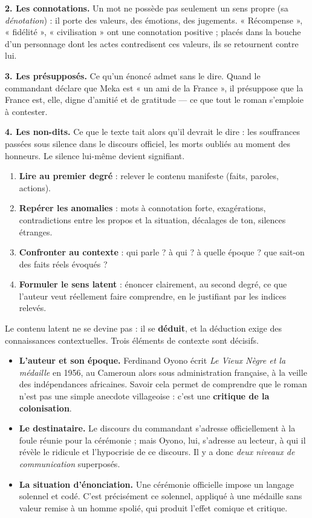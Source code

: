 \documentclass[11pt]{article}
\newcounter{popsec}
\newcounter{popsub}
\newcommand{\courssub}[1]{%
  \stepcounter{popsub}%
  \par\vspace{9pt}\noindent{\popxbold\fontsize{11.5}{13}\selectfont\color{popink}{\color{poporange}\thepopsec.\thepopsub}\hspace{6pt}#1}\par\nopagebreak\vspace{4pt}
}
\begin{document}
\textbf{2. Les connotations.} Un mot ne possède pas seulement un sens propre (sa \emph{dénotation}) : il porte des valeurs, des émotions, des jugements. « Récompense », « fidélité », « civilisation » ont une connotation positive ; placés dans la bouche d'un personnage dont les actes contredisent ces valeurs, ils se retournent contre lui.

\textbf{3. Les présupposés.} Ce qu'un énoncé admet sans le dire. Quand le commandant déclare que Meka est « un ami de la France », il présuppose que la France est, elle, digne d'amitié et de gratitude — ce que tout le roman s'emploie à contester.

\textbf{4. Les non-dits.} Ce que le texte tait alors qu'il devrait le dire : les souffrances passées sous silence dans le discours officiel, les morts oubliés au moment des honneurs. Le silence lui-même devient signifiant.

\begin{methode}
\begin{enumerate}
\item \textbf{Lire au premier degré} : relever le contenu manifeste (faits, paroles, actions).
\item \textbf{Repérer les anomalies} : mots à connotation forte, exagérations, contradictions entre les propos et la situation, décalages de ton, silences étranges.
\item \textbf{Confronter au contexte} : qui parle ? à qui ? à quelle époque ? que sait-on des faits réels évoqués ?
\item \textbf{Formuler le sens latent} : énoncer clairement, au second degré, ce que l'auteur veut réellement faire comprendre, en le justifiant par les indices relevés.
\end{enumerate}
\end{methode}

\courssub{Le rôle du contexte dans le décodage}

Le contenu latent ne se devine pas : il se \textbf{déduit}, et la déduction exige des connaissances contextuelles. Trois éléments de contexte sont décisifs.

\begin{itemize}
\item \textbf{L'auteur et son époque.} Ferdinand Oyono écrit \emph{Le Vieux Nègre et la médaille} en 1956, au Cameroun alors sous administration française, à la veille des indépendances africaines. Savoir cela permet de comprendre que le roman n'est pas une simple anecdote villageoise : c'est une \textbf{critique de la colonisation}.
\item \textbf{Le destinataire.} Le discours du commandant s'adresse officiellement à la foule réunie pour la cérémonie ; mais Oyono, lui, s'adresse au lecteur, à qui il révèle le ridicule et l'hypocrisie de ce discours. Il y a donc \emph{deux niveaux de communication} superposés.
\item \textbf{La situation d'énonciation.} Une cérémonie officielle impose un langage solennel et codé. C'est précisément ce solennel, appliqué à une médaille sans valeur remise à un homme spolié, qui produit l'effet comique et critique.
\end{itemize}
\end{document}
